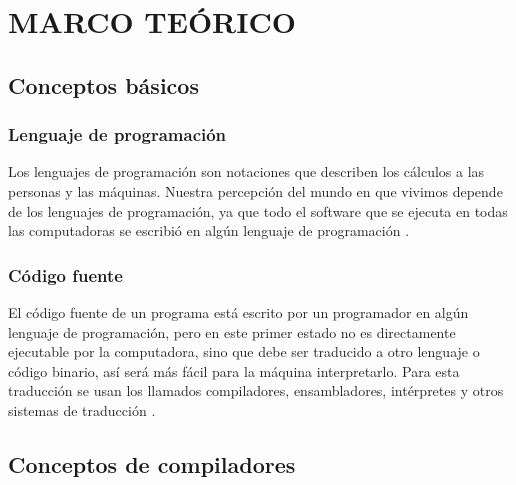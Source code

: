 \chapter{MARCO TEÓRICO}

\section{Conceptos básicos}
\subsection{Lenguaje de programación}
Los lenguajes de programación son notaciones que describen los cálculos a las personas y las máquinas. Nuestra percepción del mundo en que vivimos depende de los lenguajes de programación, ya que todo el software que se ejecuta en todas las computadoras se escribió en algún lenguaje de programación \cite{aho2008compiladores}.

\subsection{Código fuente}
El código fuente de un programa está escrito por un programador en algún lenguaje de programación, pero en este primer estado no es directamente ejecutable por la computadora, sino que debe ser traducido a otro lenguaje o código binario, así será más fácil para la máquina interpretarlo. Para esta traducción se usan los llamados compiladores, ensambladores, intérpretes y otros sistemas de traducción \cite{wiki:Source_Code}.

\section{Conceptos de compiladores}
